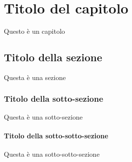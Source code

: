 \documentclass{report}
\begin{document}
    \chapter{Titolo del capitolo}
    Questo \`e un capitolo
    \section{Titolo della sezione}
    Questa \`e una sezione
    \subsection{Titolo della sotto-sezione}
    Questa \`e una sotto-sezione
    \subsubsection{Titolo della sotto-sotto-sezione}
    Questa \`e una sotto-sotto-sezione
\end{document}
